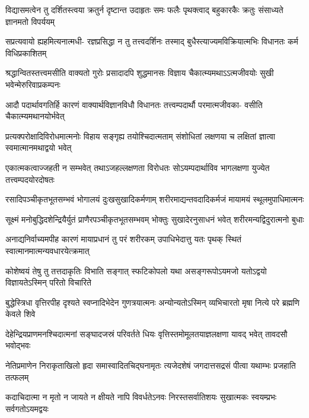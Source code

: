 \fourlineindentedshloka
{विद्यासमत्वेन तु दर्शितस्त्वया}
{क्रतुर्न दृष्टान्त उदाहृतः समः}
{फलैः पृथक्त्वाद् बहुकारकैः क्रतुः}
{संसाध्यते ज्ञानमतो विपर्ययम्} %

\fourlineindentedshloka
{सप्रत्यवायो ह्यहमित्यनात्मधी-}
{रज्ञप्रसिद्धा न तु तत्त्वदर्शिनः}
{तस्माद् बुधैस्त्याज्यमविक्रियात्मभिः}
{विधानतः कर्म विधिप्रकाशितम्} %

\fourlineindentedshloka
{श्रद्धान्वितस्तत्त्वमसीति वाक्यतो}
{गुरोः प्रसादादपि शुद्धमानसः}
{विज्ञाय चैकात्म्यमथाऽऽत्मजीवयोः}
{सुखी भवेन्मेरुरिवाप्रकम्पनः} %

\fourlineindentedshloka
{आदौ पदार्थावगतिर्हि कारणं}
{वाक्यार्थविज्ञानविधौ विधानतः}
{तत्त्वम्पदार्थौ परमात्मजीवका-}
{वसीति चैकात्म्यमथानयोर्भवेत्} %

\fourlineindentedshloka
{प्रत्यक्परोक्षादिविरोधमात्मनोः}
{विहाय सङ्गृह्य तयोश्चिदात्मताम्}
{संशोधितां लक्षणया च लक्षितां}
{ज्ञात्वा स्वमात्मानमथाद्वयो भवेत्} %

\fourlineindentedshloka
{एकात्मकत्वाज्जहती न सम्भवेत्}
{तथाऽजहल्लक्षणता विरोधतः}
{सोऽयम्पदार्थाविव भागलक्षणा}
{युज्येत तत्त्वम्पदयोरदोषतः} %

\fourlineindentedshloka
{रसादिपञ्चीकृतभूतसम्भवं}
{भोगालयं दुःखसुखादिकर्मणाम्}
{शरीरमाद्यन्तवदादिकर्मजं}
{मायामयं स्थूलमुपाधिमात्मनः} %

\fourlineindentedshloka
{सूक्ष्मं मनोबुद्धिदशेन्द्रियैर्युतं}
{प्राणैरपञ्चीकृतभूतसम्भवम्}
{भोक्तुः सुखादेरनुसाधनं भवेत्}
{शरीरमन्यद्विदुरात्मनो बुधाः} %

\fourlineindentedshloka
{अनाद्यनिर्वाच्यमपीह कारणं}
{मायाप्रधानं तु परं शरीरकम्}
{उपाधिभेदात्तु यतः पृथक् स्थितं}
{स्वात्मानमात्मन्यवधारयेत्क्रमात्} %

\fourlineindentedshloka
{कोशेष्वयं तेषु तु तत्तदाकृतिः}
{विभाति सङ्गात् स्फटिकोपलो यथा}
{असङ्गरूपोऽयमजो यतोऽद्वयो}
{विज्ञायतेऽस्मिन् परितो विचारिते} %

\fourlineindentedshloka
{बुद्धेस्त्रिधा वृत्तिरपीह दृश्यते}
{स्वप्नादिभेदेन गुणत्रयात्मनः}
{अन्योन्यतोऽस्मिन् व्यभिचारतो मृषा}
{नित्ये परे ब्रह्मणि केवले शिवे} %

\fourlineindentedshloka
{देहेन्द्रियप्राणमनश्चिदात्मनां}
{सङ्घादजस्रं परिवर्तते धियः}
{वृत्तिस्तमोमूलतयाज्ञलक्षणा}
{यावद् भवेत् तावदसौ भवोद्भवः} %

\fourlineindentedshloka
{नेतिप्रमाणेन निराकृताखिलो}
{हृदा समास्वादितचिद्घनामृतः}
{त्यजेदशेषं जगदात्तसद्रसं}
{पीत्वा यथाम्भः प्रजहाति तत्फलम्} %

\fourlineindentedshloka
{कदाचिदात्मा न मृतो न जायते}
{न क्षीयते नापि विवर्धतेऽनवः}
{निरस्तसर्वातिशयः सुखात्मकः}
{स्वयम्प्रभः सर्वगतोऽयमद्वयः} %

